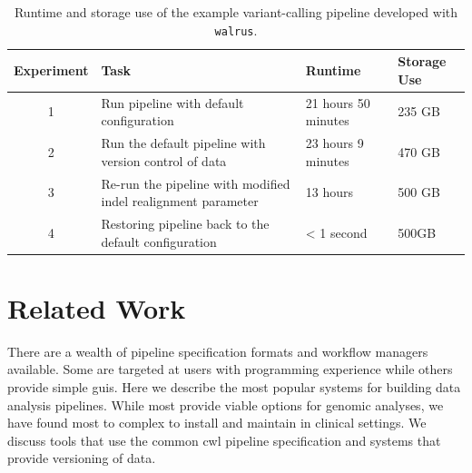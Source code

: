 \begin{table}[ht!]
    \centering
    \caption{Runtime and storage use of the example variant-calling pipeline
    developed with \texttt{walrus}.} 
    \begin{tabular}{ | c | p{4cm} | p{2cm} | p{2cm} |}
    \hline
    Experiment & Task & Runtime & Storage Use \\ \hline
    1 & Run pipeline with default configuration & 21 hours 50 minutes & 235 GB
        \\ \hline
    2 & Run the default pipeline with version control of data & 23 hours 9
        minutes & 470 GB \\ \hline
    3 & Re-run the pipeline with modified indel realignment parameter & 13 hours
        & 500 GB \\ \hline
    4 & Restoring pipeline back to the default configuration & < 1 second &
        500GB \\ \hline
    \end{tabular}
    \label{resultstable}
\end{table}




\section{Related Work} 
There are a wealth of pipeline specification formats and workflow managers
available. Some are targeted at users with programming experience while others
provide simple \glspl{gui}.  Here we describe the most popular systems for
building data analysis pipelines. While most provide viable options for genomic
analyses, we have found most to complex to install and maintain in clinical
settings. We discuss tools that use the common \gls{cwl} pipeline specification
and systems that provide versioning of data. 

